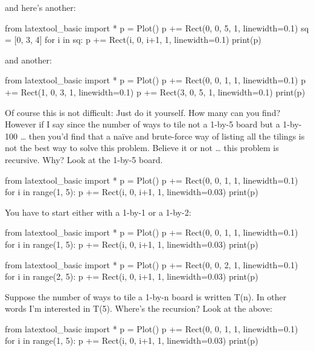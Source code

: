 and here's another:

\begin{python}
from latextool_basic import *
p = Plot()
p += Rect(0, 0, 5, 1, linewidth=0.1)
sq = [0, 3, 4]
for i in sq:
    p += Rect(i, 0, i+1, 1, linewidth=0.1)
print(p)
\end{python}

and another:

\begin{python}
from latextool_basic import *
p = Plot()
p += Rect(0, 0, 1, 1, linewidth=0.1)
p += Rect(1, 0, 3, 1, linewidth=0.1)
p += Rect(3, 0, 5, 1, linewidth=0.1)
print(p)
\end{python}

Of course this is not difficult: Just do it yourself. How many can you find? However if I say since the number of ways to tile not a 1-by-5 board but a 1-by-100 \ldots{} then you'd find that a na\"ive and brute-force way of listing all the tilings is not the best way to solve this problem. Believe it or not \ldots{} this problem is recursive. Why? Look at the 1-by-5 board.

\begin{python}
from latextool_basic import *
p = Plot()
p += Rect(0, 0, 1, 1, linewidth=0.1)
for i in range(1, 5):
    p += Rect(i, 0, i+1, 1, linewidth=0.03)
print(p)
\end{python}

You have to start either with a 1-by-1 or a 1-by-2:

\begin{python}
from latextool_basic import *
p = Plot()
p += Rect(0, 0, 1, 1, linewidth=0.1)
for i in range(1, 5):
    p += Rect(i, 0, i+1, 1, linewidth=0.03)
print(p)
\end{python}

\begin{python}
from latextool_basic import *
p = Plot()
p += Rect(0, 0, 2, 1, linewidth=0.1)
for i in range(2, 5):
    p += Rect(i, 0, i+1, 1, linewidth=0.03)
print(p)
\end{python}

Suppose the number of ways to tile a 1-by-n board is written T(n). In
other words I'm interested in T(5).
Where's the recursion? Look at the above:

\begin{python}
from latextool_basic import *
p = Plot()
p += Rect(0, 0, 1, 1, linewidth=0.1)
for i in range(1, 5):
    p += Rect(i, 0, i+1, 1, linewidth=0.03)
print(p)
\end{python}


